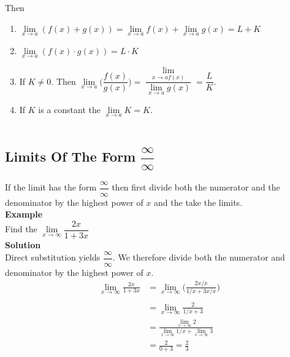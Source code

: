 \documentclass[11pt,a4paper]{article}
\begin{document}
Then
\begin{enumerate}
\item $\lim\limits_{x\longrightarrow a}(f(x)+g(x))=\lim\limits_{x\longrightarrow a}f(x)+\lim\limits_{x\longrightarrow a}g(x)=L+K$
\item $\lim\limits_{x\longrightarrow a} (f(x)\cdot g(x))=L\cdot K$
\item If $K\neq 0$. Then $\lim\limits_{x\longrightarrow a}\bigg(\dfrac{f(x)}{g(x)}\bigg)=\dfrac{\lim\limits_{x\longrightarrow a f(x)}}{\lim\limits_{x\longrightarrow a}g(x)}=\dfrac{L}{K}$.
\item If $K$ is a constant the $\lim\limits_{x\longrightarrow a} K=K$.\\\\
\end{enumerate}






\pagebreak


\subsection{Limits Of The Form $\dfrac{\infty}{\infty}$}
If the limit has the form $\dfrac{\infty}{\infty}$ then first divide both the numerator and the denominator by the highest power of $x$ and the take the limits.\\

\textbf{Example}\\
Find the $\lim\limits_{x\longrightarrow \infty}\dfrac{2x}{1+3x}$\\

\textbf{Solution}\\
Direct substitution yields $\dfrac{\infty}{\infty}$. We therefore divide both the numerator and denominator by the highest power of $x$.\\

\begin{align*}
\lim_{x\longrightarrow \infty} \frac{2x}{1+3x} & = \lim_{x\longrightarrow \infty} \bigg(\frac{2x/x}{1/x+3x/x}\bigg)\\\\
                                               & = \lim_{x\longrightarrow \infty} \frac{2}{1/x+3}\\
                                               & = \frac{\lim\limits_{x\longrightarrow \infty}2}{\lim\limits_{x\longrightarrow \infty}1/x+\lim\limits_{x\longrightarrow \infty}3}\\
                                               &=\frac{2}{0+3}=\frac{2}{3}\\
\end{align*}
\end{document}
